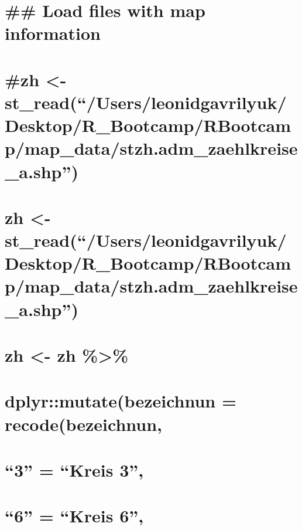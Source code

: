 \documentclass[
]{article}
\begin{document}
\hypertarget{load-files-with-map-information}{%
\section{\#\# Load files with map
information}\label{load-files-with-map-information}}

\hypertarget{zh---st_readusersleonidgavrilyukdesktopr_bootcamprbootcampmap_datastzh.adm_zaehlkreise_a.shp}{%
\section{\#zh \textless-
st\_read(``/Users/leonidgavrilyuk/Desktop/R\_Bootcamp/RBootcamp/map\_data/stzh.adm\_zaehlkreise\_a.shp'')}\label{zh---st_readusersleonidgavrilyukdesktopr_bootcamprbootcampmap_datastzh.adm_zaehlkreise_a.shp}}

\hypertarget{zh---st_readusersleonidgavrilyukdesktopr_bootcamprbootcampmap_datastzh.adm_zaehlkreise_a.shp-1}{%
\section{zh \textless-
st\_read(``/Users/leonidgavrilyuk/Desktop/R\_Bootcamp/RBootcamp/map\_data/stzh.adm\_zaehlkreise\_a.shp'')}\label{zh---st_readusersleonidgavrilyukdesktopr_bootcamprbootcampmap_datastzh.adm_zaehlkreise_a.shp-1}}

\hypertarget{zh---zh}{%
\section{zh \textless- zh \%\textgreater\%}\label{zh---zh}}

\hypertarget{dplyrmutatebezeichnun-recodebezeichnun}{%
\section{dplyr::mutate(bezeichnun =
recode(bezeichnun,}\label{dplyrmutatebezeichnun-recodebezeichnun}}

\hypertarget{kreis-3}{%
\section{``3'' = ``Kreis 3'',}\label{kreis-3}}

\hypertarget{kreis-6}{%
\section{``6'' = ``Kreis 6'',}\label{kreis-6}}
\end{document}
